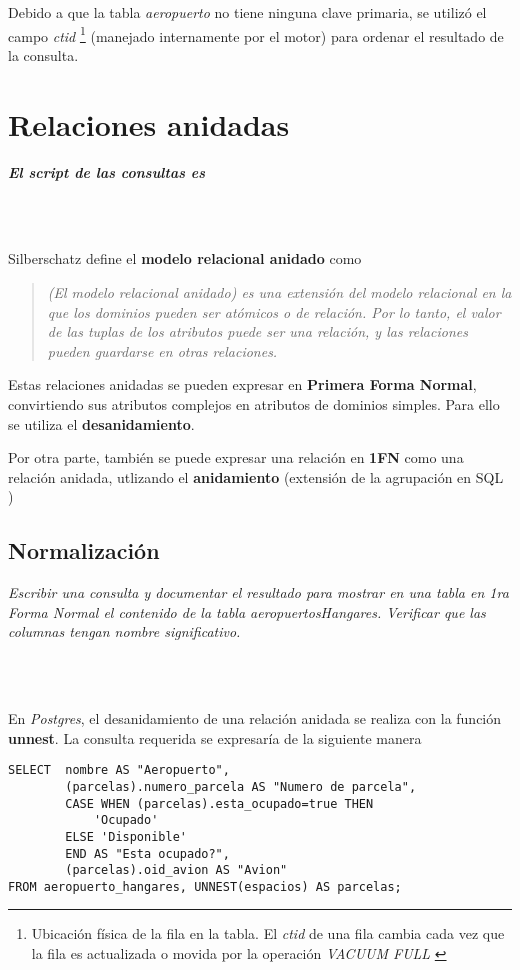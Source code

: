 Debido a que la tabla \emph{aeropuerto} no tiene ninguna clave primaria, se utilizó el campo \emph{ctid} \footnote{Ubicación física de la fila en la tabla. El \emph{ctid} de una fila cambia cada vez que la fila es actualizada o movida por la operación \emph{VACUUM FULL} \cite{ctid}} (manejado internamente por el motor) para ordenar el resultado de la consulta. 


\section{Relaciones anidadas}
\emph{\textbf{El script de las consultas es }} 

\\~

Silberschatz define el \textbf{modelo relacional anidado} como
\begin{quote}\itshape
    (El modelo relacional anidado) es una extensión del modelo relacional en la que los dominios pueden ser atómicos o de relación. Por lo tanto, el valor de las tuplas de los atributos puede ser una relación, y las relaciones pueden guardarse en otras relaciones. \cite{silberschatz}
\end{quote}

Estas relaciones anidadas se pueden expresar en \textbf{Primera Forma Normal}, convirtiendo sus atributos complejos en atributos de dominios simples. Para ello se utiliza el \textbf{desanidamiento}.

Por otra parte, también se puede expresar una relación en \textbf{1FN} como una relación anidada, utlizando el \textbf{anidamiento} (extensión de la agrupación en SQL \cite{silberschatz})  

\subsection{Normalización}
\emph{Escribir una consulta y documentar el resultado para mostrar en una tabla en 1ra Forma Normal el contenido de la tabla aeropuertosHangares. Verificar que las columnas tengan nombre significativo.} 

\\~

En \emph{Postgres}, el desanidamiento de una relación anidada se realiza con la función \textbf{unnest}. La consulta requerida se expresaría de la siguiente manera  

\vspace*{5mm}
\lstset{style=sql}
\begin{lstlisting}
SELECT  nombre AS "Aeropuerto", 
        (parcelas).numero_parcela AS "Numero de parcela", 
        CASE WHEN (parcelas).esta_ocupado=true THEN 
            'Ocupado' 
        ELSE 'Disponible' 
        END AS "Esta ocupado?", 
        (parcelas).oid_avion AS "Avion" 
FROM aeropuerto_hangares, UNNEST(espacios) AS parcelas;
\end{lstlisting}

